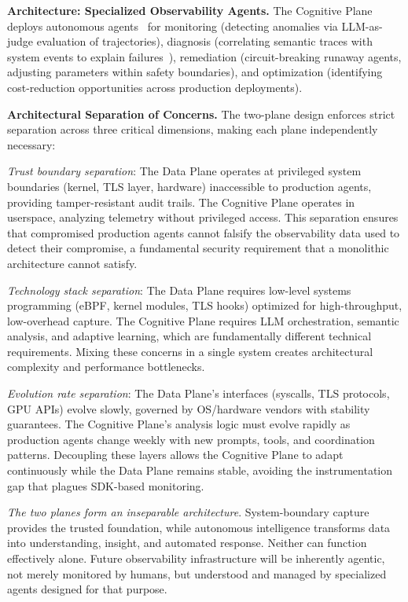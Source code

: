 \documentclass[sigplan,screen,9pt]{acmart}
\begin{document}
\textbf{Architecture: Specialized Observability Agents.} The Cognitive Plane deploys autonomous agents~\cite{Rombaut2025Watson,Kim2025AgenticInterp,Dong2024AgentOps} for monitoring (detecting anomalies via LLM-as-judge evaluation of trajectories), diagnosis (correlating semantic traces with system events to explain failures~\cite{Moshkovich2025Pipeline}), remediation (circuit-breaking runaway agents, adjusting parameters within safety boundaries), and optimization (identifying cost-reduction opportunities across production deployments).

\textbf{Architectural Separation of Concerns.} The two-plane design enforces strict separation across three critical dimensions, making each plane independently necessary:

\emph{Trust boundary separation}: The Data Plane operates at privileged system boundaries (kernel, TLS layer, hardware) inaccessible to production agents, providing tamper-resistant audit trails. The Cognitive Plane operates in userspace, analyzing telemetry without privileged access. This separation ensures that compromised production agents cannot falsify the observability data used to detect their compromise, a fundamental security requirement that a monolithic architecture cannot satisfy.

\emph{Technology stack separation}: The Data Plane requires low-level systems programming (eBPF, kernel modules, TLS hooks) optimized for high-throughput, low-overhead capture. The Cognitive Plane requires LLM orchestration, semantic analysis, and adaptive learning, which are fundamentally different technical requirements. Mixing these concerns in a single system creates architectural complexity and performance bottlenecks.

\emph{Evolution rate separation}: The Data Plane's interfaces (syscalls, TLS protocols, GPU APIs) evolve slowly, governed by OS/hardware vendors with stability guarantees. The Cognitive Plane's analysis logic must evolve rapidly as production agents change weekly with new prompts, tools, and coordination patterns. Decoupling these layers allows the Cognitive Plane to adapt continuously while the Data Plane remains stable, avoiding the instrumentation gap that plagues SDK-based monitoring.

\emph{The two planes form an inseparable architecture}. System-boundary capture provides the trusted foundation, while autonomous intelligence transforms data into understanding, insight, and automated response. Neither can function effectively alone. Future observability infrastructure will be inherently agentic, not merely monitored by humans, but understood and managed by specialized agents designed for that purpose.
\end{document}
